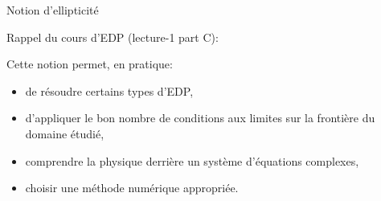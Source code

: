 \documentclass[
mode=present,    %
paper=a4paper,   %
orient=landscape,
display=slides,   %
size=10pt,
style=romain   %
]{powerdot}
\begin{document}
\begin{slide}[toc=Ellipticité]{Notion d'ellipticité}

Rappel du cours d'EDP (lecture-1 part C):


\noindent{} %


Cette notion permet, en pratique:
\begin{itemize}
\item de résoudre certains types d'EDP,
\item d'appliquer le bon nombre de conditions aux limites sur la frontière du domaine étudié,
\item comprendre la physique derrière un système d'équations complexes,
\item choisir une méthode numérique appropriée.
\end{itemize}

\end{slide}
\end{document}
